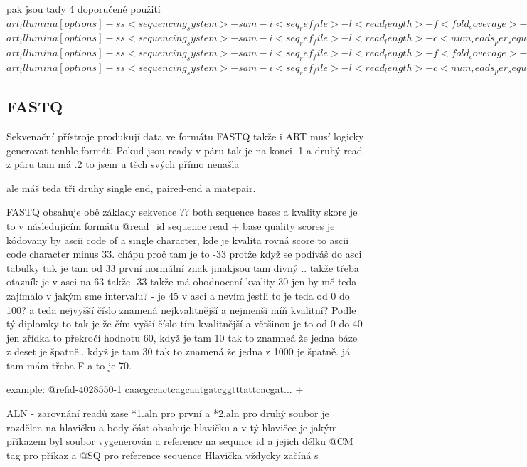 \documentclass[czech,DP]{thesiskiv}
\numberwithin{equation}{section}
\begin{document}
pak jsou tady 4 doporučené použití
$art_illumina [options] -ss <sequencing_system> -sam -i <seq_ref_file> -l <read_length> -f <fold_coverage> -o <outfile_prefix>$
$art_illumina [options] -ss <sequencing_system> -sam -i <seq_ref_file> -l <read_length> -c <num_reads_per_sequence> -o <outfile_prefix>$
$art_illumina [options] -ss <sequencing_system> -sam -i <seq_ref_file> -l <read_length> -f <fold_coverage> -m <mean_fragsize> -s <std_fragsize> -o <outfile_prefix>$
$art_illumina [options] -ss <sequencing_system> -sam -i <seq_ref_file> -l <read_length> -c <num_reads_per_sequence> -m <mean_fragsize> -s <std_fragsize> -o <outfile_prefix>$
\subsection{FASTQ}
Sekvenační přístroje produkují data ve formátu FASTQ takže i ART musí logicky generovat tenhle formát.
Pokud jsou ready v páru tak je na konci .1
a druhý read z páru tam má .2 to jsem u těch svých přímo nenašla 

ale máš teda tři druhy single end, paired-end a matepair. 

FASTQ obsahuje obě základy sekvence ?? both sequence bases a kvality skore je to v následujícím formátu
@read\_id
sequence read
+
base quality scores je kódovany by ascii code of a single character, kde je kvalita rovná score to ascii code character minus 33. chápu proč tam je to -33 protže když se podíváš do asci tabulky tak je tam od 33 první normální znak jinakjsou tam divný .. 
takže třeba otazník je v asci na 63 takže -33 takže má ohodnocení kvality 30
jen by mě teda zajímalo v jakým sme intervalu? - je 45 v asci a nevím jestli to je teda od 0 do 100?  a teda nejvyšší číslo znamená nejkvalitnější a nejmenši míň kvalitní? Podle tý diplomky to tak je že čím vyšší číslo tím kvalitnější a většinou je to od 0 do 40 jen zřídka to překročí hodnotu 60, když je tam 10 tak to znamneá že jedna báze z deset je špatně.. když je tam 30 tak to znamená že jedna z 1000 je špatně.
já tam mám třeba F a to je 70.

example:
		@refid-4028550-1 
		caacgccactcagcaatgatcggtttattcacgat...
		+ 

ALN - zarovnání readů
zase *1.aln pro první a *2.aln pro druhý
soubor je rozdělen na hlavičku a body část
obsahuje hlavičku a v tý hlavičce je jakým příkazem byl soubor vygenerován a reference na sequnce id a jejich délku
@CM tag pro příkaz a
@SQ pro reference sequence
Hlavička vždycky začíná s 
\end{document}
